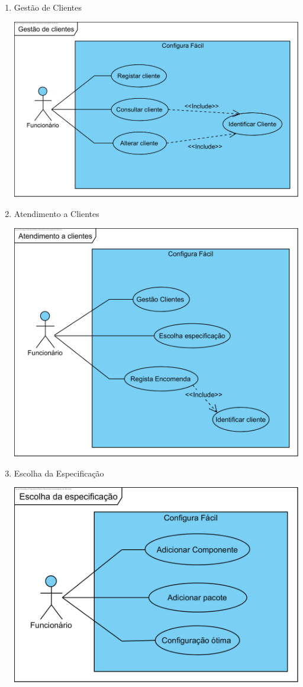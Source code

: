 \documentclass[11pt]{article} %
\begin{document}
\begin{enumerate}
	\item Gestão de Clientes
		\begin{center}
 			\includegraphics[]{Gestao_de_clientes.png}
		\end{center}
	\item Atendimento a Clientes
		\begin{center}
 			\includegraphics[]{Atendimento_a_clientes.png}
		\end{center}\newpage
	\item Escolha da Especificação
		\begin{center}
 			\includegraphics[]{Escolha_da_especificacao.png}

\end{center}
\end{enumerate}
\end{document}
